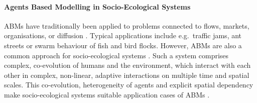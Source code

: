 \paragraph{Agents Based Modelling in Socio-Ecological Systems}
ABMs have traditionally been applied to problems connected to flows, markets, organisations, or diffusion \citep{Bonabeau2002}.
Typical applications include e.g.\ traffic jams, ant streets or swarm behaviour of fish and bird flocks.
However, ABMs are also a common approach for socio-ecological systems \citep{Muller-Hansen2017}.
Such a system comprises complex, co-evolution of humans and the environment, which interact with each other in complex, non-linear, adaptive interactions on multiple time and spatial scales.
This co-evolution, heterogeneity of agents and explicit spatial dependency make socio-ecological systems suitable application cases of ABMs \citep{Bousquet2004}.




